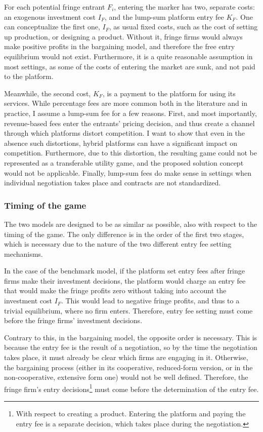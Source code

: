 \documentclass[a4paper]{article}
\begin{document}
For each potential fringe entrant $F_i$, entering the marker has two, separate costs: an exogenous investment cost $I_F$, and the lump-sum platform entry fee $K_F$.
One can conceptualize the first one, $I_F$, as usual fixed costs, such as the cost of setting up production, or designing a product.
Without it, fringe firms would always make positive profits in the bargaining model, and therefore the free entry equilibrium would not exist.
Furthermore, it is a quite reasonable assumption in most settings, as some of the costs of entering the market are sunk, and not paid to the platform.

Meanwhile, the second cost, $K_F$, is a payment to the platform for using its services.
While percentage fees are more common both in the literature and in practice, I assume a lump-sum fee for a few reasons.
First, and most importantly, revenue-based fees enter the entrants' pricing decision, and thus create a channel through which platforms distort competition.
I want to show that even in the absence such distortions, hybrid platforms can have a significant impact on competition.
Furthermore, due to this distortion, the resulting game could not be represented as a transferable utility game, and the proposed solution concept would not be applicable.
Finally, lump-sum fees do make sense in settings when individual negotiation takes place and contracts are not standardized.

\subsubsection{Timing of the game}

The two models are designed to be as similar as possible, also with respect to the timing of the game.
The only difference is in the order of the first two stages, which is necessary due to the nature of the two different entry fee setting mechanisms.

In the case of the benchmark model, if the platform set entry fees after fringe firms make their investment decisions, the platform would charge an entry fee that would make the fringe profits zero without taking into account the investment cost $I_F$.
This would lead to negative fringe profits, and thus to a trivial equilibrium, where no firm enters.
Therefore, entry fee setting must come before the fringe firms' investment decisions.

Contrary to this, in the bargaining model, the opposite order is necessary.
This is because the entry fee is the result of a negotiation, so by the time the negotiation takes place, it must already be clear which firms are engaging in it.
Otherwise, the bargaining process (either in its cooperative, reduced-form version, or in the non-cooperative, extensive form one) would not be well defined.
Therefore, the fringe firm's entry decisions\footnote{
    With respect to creating a product.
    Entering the platform and paying the entry fee is a separate decision, which takes place during the negotiation.
} must come before the determination of the entry fee.
\end{document}
